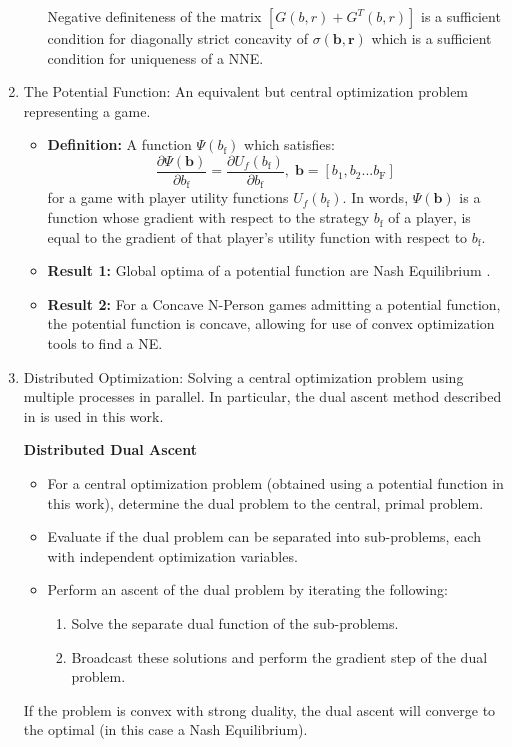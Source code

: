 \documentclass[12pt,a4paper]{report}
\begin{document}
\begin{enumerate}
\begin{itemize}
Negative definiteness of the matrix $[G(b,r)+G^{T}(b,r)] $ is a sufficient condition for diagonally strict concavity of $\sigma(\mathbf{b},\mathbf{r})$ which is a sufficient condition for uniqueness of a NNE.


\end{itemize}
\item The Potential Function: An equivalent but central optimization problem representing a game.
\begin{itemize}
\item
\textbf{Definition:}  A function
$ \Psi(b_{\text{f}})$ which satisfies:
\begin{equation}\label{potential_game_condition}
\frac{\partial \Psi(\mathbf{b})}{\partial b_{\text{f}}}
 =
 \frac{\partial U_f(b_{\text{f}})}{\partial b_{\text{f}}},
 \;\textbf{b}=[b_{1}, b_2... b_{\text{F}}]
\end{equation} 
for a game with player utility functions $U_f(b_{\text{f}})$.
In words, $ \Psi(\mathbf{b})$ is a function whose gradient with respect to the strategy $b_{\text{f}}$ of a player, is equal to the gradient of that player's utility function with respect to $b_{\text{f}}$.
\item \textbf{Result 1:} Global optima of a potential function are Nash Equilibrium \cite{monderer1996potential}.
\item \textbf{Result 2:} For a Concave N-Person games admitting a potential function, the potential function is concave, allowing for use of convex optimization tools to find a NE. 
\end{itemize}



\item Distributed Optimization: Solving a central optimization problem using multiple processes in parallel.
In particular, the dual ascent method described in \cite{boyd2011distributed} is used in this work.

\textbf{Distributed Dual Ascent} 
\begin{itemize}
\item For a central optimization problem (obtained using a potential function in this work), determine the dual problem to the central, primal problem.
\item Evaluate if the dual problem can be separated into sub-problems, each with independent optimization variables.
\item Perform an ascent of the dual problem by iterating the following:
\begin{enumerate}
\item Solve the separate dual function of the sub-problems.
\item Broadcast these solutions and perform the gradient step of the dual problem.
\end{enumerate}
\end{itemize}

If the problem is convex with strong duality, the dual ascent will converge to the optimal (in this case a Nash Equilibrium).

\end{enumerate}
\end{document}
